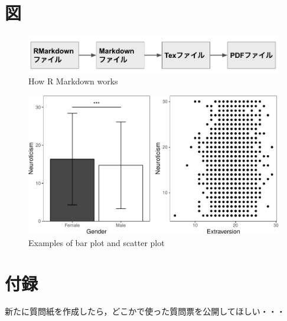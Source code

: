 \documentclass[11pt,a4paper,xelatex,ja=standard]{bxjsarticle}
\begin{document}
\clearpage

\hypertarget{ux56f3}{%
\section{図}\label{ux56f3}}

\begin{figure}
\centering
\includegraphics{fig1.png}
\caption{How R Markdown works}
\end{figure}

\clearpage

\begin{figure}
\centering
\includegraphics{test_files/figure-latex/figs-1.pdf}
\caption{\label{fig:figs}Examples of bar plot and scatter plot}
\end{figure}

\clearpage

\hypertarget{ux4ed8ux9332}{%
\section{付録}\label{ux4ed8ux9332}}

新たに質問紙を作成したら，どこかで使った質問票を公開してほしい・・・
\end{document}

